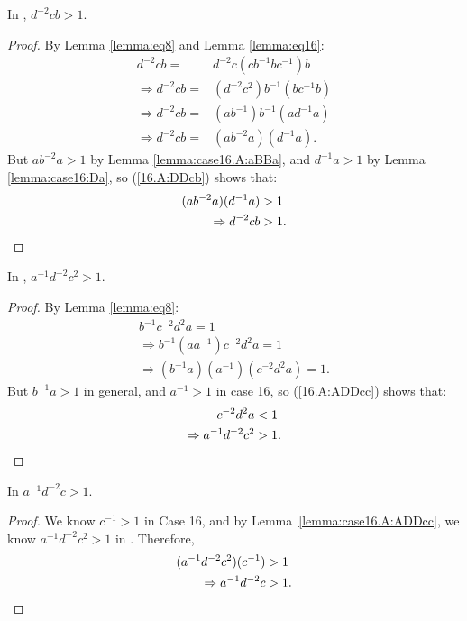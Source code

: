 \begin{lemma} In , $d^{-2}cb>1$.
\label{lemma:case16.A:DDcb}
\end{lemma}
\begin{proof} By Lemma \ref{lemma:eq8} and Lemma \ref{lemma:eq16}:
\begin{align}
d^{-2}cb=&d^{-2}c(cb^{-1}bc^{-1})b\nonumber{}\\
\Rightarrow{}d^{-2}cb=&(d^{-2}c^{2})b^{-1}(bc^{-1}b)\nonumber{}\\
\Rightarrow{}d^{-2}cb=&(ab^{-1})b^{-1}(ad^{-1}a)\nonumber{}\\
\Rightarrow{}d^{-2}cb=&(ab^{-2}a)(d^{-1}a).
\label{16.A:DDcb}
\end{align}
But $ab^{-2}a>1$ by Lemma \ref{lemma:case16.A:aBBa}, and $d^{-1}a>1$ by Lemma \ref{lemma:case16:Da}, so (\ref{16.A:DDcb}) shows that:
\begin{align*}
(ab^{-2}a)(d^{-1}a)&>1\\
\Rightarrow{}d^{-2}cb&>1.\qedhere
\end{align*}
\end{proof}

\begin{lemma} In , $a^{-1}d^{-2}c^{2}>1$.
\label{lemma:case16.A:ADDcc}
\end{lemma}
\begin{proof} By Lemma \ref{lemma:eq8}:
\begin{align}
b^{-1}c^{-2}d^{2}a=1\nonumber{}\\
\Rightarrow{}b^{-1}(aa^{-1})c^{-2}d^{2}a=1\nonumber{}\\
\Rightarrow{}(b^{-1}a)(a^{-1})(c^{-2}d^{2}a)=1.
\label{16.A:ADDcc}
\end{align}
But $b^{-1}a>1$ in general, and $a^{-1}>1$ in case 16, so (\ref{16.A:ADDcc}) shows that:
\begin{align*}
c^{-2}d^{2}a&<1\\
\Rightarrow{}a^{-1}d^{-2}c^{2}&>1.\qedhere
\end{align*}
\end{proof}

\begin{corollary} In  $a^{-1}d^{-2}c>1$.
\label{corollary:case16.A:ADDc}
\end{corollary}
\begin{proof} We know $c^{-1}>1$ in Case 16, and by Lemma~\ref{lemma:case16.A:ADDcc}, we know $a^{-1}d^{-2}c^{2}>1$ in . Therefore,
\begin{align*}
 (a^{-1}d^{-2}c^{2})(c^{-1})&>1\\
 \Rightarrow{}a^{-1}d^{-2}c&>1.\qedhere
 \end{align*}
 \end{proof}
 

